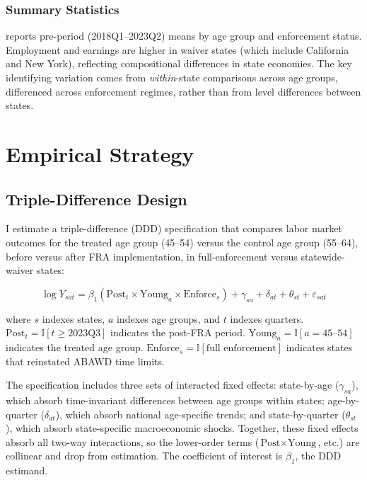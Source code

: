 \documentclass[12pt]{article}
\newcommand{\ind}{\mathbb{I}}
\begin{document}
\subsubsection*{Summary Statistics}  reports pre-period (2018Q1--2023Q2) means by age group and enforcement status. Employment and earnings are higher in waiver states (which include California and New York), reflecting compositional differences in state economies. The key identifying variation comes from \textit{within}-state comparisons across age groups, differenced across enforcement regimes, rather than from level differences between states.




\section{Empirical Strategy}
\label{sec:strategy}

\subsection{Triple-Difference Design}

I estimate a triple-difference (DDD) specification that compares labor market outcomes for the treated age group (45--54) versus the control age group (55--64), before versus after FRA implementation, in full-enforcement versus statewide-waiver states:

\begin{equation}
\label{eq:ddd}
\log Y_{sat} = \beta_1 (\text{Post}_t \times \text{Young}_a \times \text{Enforce}_s) + \gamma_{sa} + \delta_{at} + \theta_{st} + \varepsilon_{sat}
\end{equation}

\noindent where $s$ indexes states, $a$ indexes age groups, and $t$ indexes quarters. $\text{Post}_t = \ind[t \geq \text{2023Q3}]$ indicates the post-FRA period. $\text{Young}_a = \ind[a = \text{45--54}]$ indicates the treated age group. $\text{Enforce}_s = \ind[\text{full enforcement}]$ indicates states that reinstated ABAWD time limits.

The specification includes three sets of interacted fixed effects: state-by-age ($\gamma_{sa}$), which absorb time-invariant differences between age groups within states; age-by-quarter ($\delta_{at}$), which absorb national age-specific trends; and state-by-quarter ($\theta_{st}$), which absorb state-specific macroeconomic shocks. Together, these fixed effects absorb all two-way interactions, so the lower-order terms ($\text{Post} \times \text{Young}$, etc.) are collinear and drop from estimation. The coefficient of interest is $\beta_1$, the DDD estimand.
\end{document}
